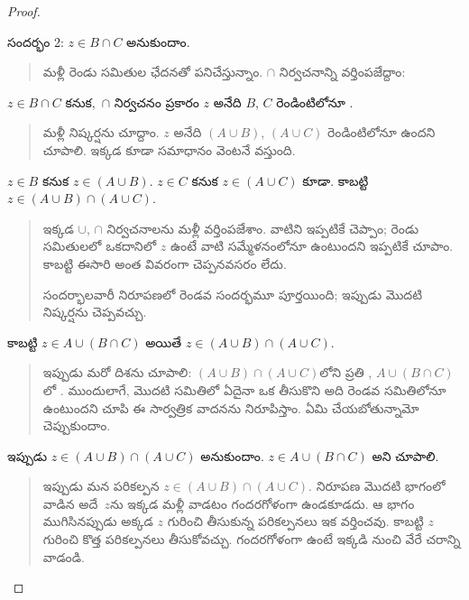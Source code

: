 \documentclass[../../../include/open-logic-section]{subfiles}
\begin{document}
\begin{proof}
\begin{quote}
\end{quote}
సందర్భం 2: $z \in B \cap C$ అనుకుందాం.
\begin{quote}
మళ్లీ రెండు సమితుల ఛేదనతో పనిచేస్తున్నాం. $\cap$ నిర్వచనాన్ని వర్తింపజేద్దాం:
\end{quote}
$z \in B \cap C$ కనుక,~$\cap$ నిర్వచనం ప్రకారం $z$ అనేది $B$, $C$ రెండింటిలోనూ .
\begin{quote}
మళ్లీ నిష్కర్షను చూద్దాం. $z$ అనేది $(A \cup B)$, $(A \cup C)$ రెండింటిలోనూ ఉందని చూపాలి. ఇక్కడ కూడా సమాధానం వెంటనే వస్తుంది.
\end{quote}
$z \in B$ కనుక $z \in (A \cup B)$. $z \in C$ కనుక $z \in (A
\cup C)$ కూడా. కాబట్టి $z \in (A \cup B) \cap (A \cup C)$.
\begin{quote}
ఇక్కడ $\cup$, $\cap$ నిర్వచనాలను మళ్లీ వర్తింపజేశాం. వాటిని ఇప్పటికే చెప్పాం; రెండు సమితులలో ఒకదానిలో $z$ ఉంటే వాటి సమ్మేళనంలోనూ ఉంటుందని ఇప్పటికే చూపాం. కాబట్టి ఈసారి అంత వివరంగా చెప్పనవసరం లేదు.

సందర్భాలవారీ నిరూపణలో రెండవ సందర్భమూ పూర్తయింది; ఇప్పుడు మొదటి నిష్కర్షను చెప్పవచ్చు.
\end{quote}
కాబట్టి $z \in A \cup (B \cap C)$ అయితే $z \in (A \cup B) \cap (A \cup C)$.
\begin{quote}
ఇప్పుడు మరో దిశను చూపాలి: $(A \cup B) \cap (A \cup C)$లోని ప్రతి , $A \cup (B \cap
C)$లో . ముందులాగే, మొదటి సమితిలో ఏదైనా ఒక  తీసుకొని అది రెండవ సమితిలోనూ ఉంటుందని చూపి ఈ సార్వత్రిక వాదనను నిరూపిస్తాం. ఏమి చేయబోతున్నామో చెప్పుకుందాం.
\end{quote}
ఇప్పుడు $z \in (A \cup B) \cap (A \cup C)$ అనుకుందాం. $z \in A \cup (B \cap C)$ అని చూపాలి.
\begin{quote}
ఇప్పుడు మన పరికల్పన $z \in (A \cup B) \cap (A
\cup C)$. నిరూపణ మొదటి భాగంలో వాడిన అదే~$z$ను ఇక్కడ మళ్లీ వాడటం గందరగోళంగా ఉండకూడదు. ఆ భాగం ముగిసినప్పుడు అక్కడ $z$ గురించి తీసుకున్న పరికల్పనలు ఇక వర్తించవు. కాబట్టి $z$ గురించి కొత్త పరికల్పనలు తీసుకోవచ్చు. గందరగోళంగా ఉంటే ఇక్కడి నుంచి వేరే చరాన్ని వాడండి.


\end{quote}
\end{proof}
\end{document}
